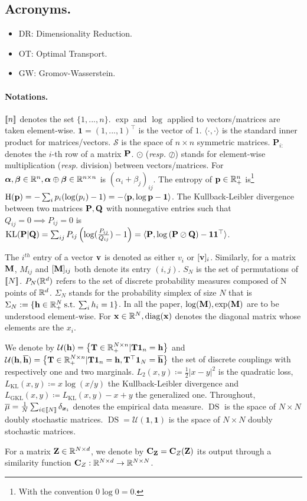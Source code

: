 \subsection*{Acronyms.}
\begin{itemize}
	\item DR: Dimensionality Reduction.
	\item OT: Optimal Transport.
	\item GW: Gromov-Wasserstein.
\end{itemize}

\paragraph{Notations.} ${[\![n]\!]}$ denotes the set $\{1,...,n\}$. $\exp$ and $\log$ applied to vectors/matrices are taken element-wise. $\bm{1}
= (1,...,1)^\top$ is the vector of $1$. $\langle \cdot, \cdot \rangle$ is the standard inner product for matrices/vectors. $\mathcal{S}$ is the space of $n \times n$ symmetric matrices. $\mathbf{P}_{i:}$ denotes the $i$-th row of a matrix $\mathbf{P}$. $\odot$ (\textit{resp.} $\oslash$) stands for element-wise multiplication (\textit{resp.} division) between vectors/matrices. For $\bm{\alpha}, \bm{\beta} \in \mathbb{R}^n, \bm{\alpha} \oplus \bm{\beta} \in \mathbb{R}^{n \times n}$ is $(\alpha_i + \beta_j)_{ij}$. The entropy of $\mathbf{p} \in \mathbb{R}^{n}_+$ is\footnote{With the convention $0 \log 0 = 0$.} $\operatorname{H}(\mathbf{p}) = -\sum_{i} p_i(\log(p_i)-1) = -\langle \mathbf{p}, \log \mathbf{p} - \bm{1} \rangle$. The Kullback-Leibler divergence between two matrices $\mathbf{P}, \mathbf{Q}$ with nonnegative entries such that $Q_{ij} = 0 \implies P_{ij}=0$ is $\operatorname{KL}(\mathbf{P} | \mathbf{Q}) = \sum_{ij} P_{ij}\left(\log(\frac{P_{ij}}{Q_{ij}})-1\right) = \langle \mathbf{P}, \log \left(\mathbf{P} \oslash \mathbf{Q} \right) - \bm{1}\bm{1}^\top \rangle$.


The $i^{th}$ entry of a vector ${\mathbf{v}}$ is denoted as either $v_i$ or $[{\mathbf{v}}]_i$.
Similarly, for a matrix ${\mathbf{M}}$, $M_{ij}$ and $[{\mathbf{M}}]_{ij}$ both denote its entry $(i,j)$. $S_N$ is the set of permutations of ${[\![N]\!]}$.
$P_N(\mathbb{R}^d)$ refers to the set of discrete probability measures composed of N points of $\mathbb{R}^d$.
$\Sigma_N$ stands for the probability simplex of size $N$ that is $\Sigma_N := \{{\mathbf{h}} \in \mathbb{R}^N_+ \: \text{s.t.} \: \sum_i h_i = 1 \}$. In all the paper, $\log({\mathbf{M}}), \exp({\mathbf{M}})$ are to be understood element-wise. For ${\mathbf{x}} \in \mathbb{R}^{N}, \operatorname{diag}({\mathbf{x}})$ denotes the diagonal matrix whose elements are the $x_i$.


We denote by ${\mathcal{U}}({\mathbf{h}}) = \left\{ {\mathbf{T}} \in \mathbb{R}_+^{N \times n} | {\mathbf{T}} \bm{1}_n = {\mathbf{h}} \right\}$ and ${\mathcal{U}}({\mathbf{h}}, \overline{{\mathbf{h}}}) = \left\{ {\mathbf{T}} \in \mathbb{R}_+^{N \times n} | {\mathbf{T}} \bm{1}_n = {\mathbf{h}}, {\mathbf{T}}^\top \bm{1}_N = \overline{{\mathbf{h}}} \right\}$ the set of discrete couplings with respectively one and two marginals.
 $L_2(x,y) \coloneqq \frac{1}{2} |x - y|^2$ is the quadratic loss,  $L_{\mathrm{KL}}(x,y) \coloneqq x \log (x/y)$ the Kullback-Leibler divergence and $L_{\mathrm{GKL}}(x,y) \coloneqq L_{\mathrm{KL}}(x,y) - x + y $ the generalized one.
Throughout, $\overline{\mu} = \frac{1}{N} \sum_{i \in {[\![N]\!]}} \delta_{\bm{x}_i}$ denotes the empirical data measure. 
$\operatorname{DS}$ is the space of $N \times N$ doubly stochastic matrices.
$\operatorname{DS} = \mathcal{U}(\bm{1}, \bm{1})$ is the space of $N \times N$ doubly stochastic matrices.

For a matrix ${\mathbf{Z}} \in \mathbb{R}^{N \times d}$, we denote by ${\mathbf{C}}_{{\mathbf{Z}}} =  {\mathbf{C}}_{Z}({\mathbf{Z}})$ its output through a similarity function ${\mathbf{C}}_{Z}: \mathbb{R}^{N \times d} \to \mathbb{R}^{N \times N}$.